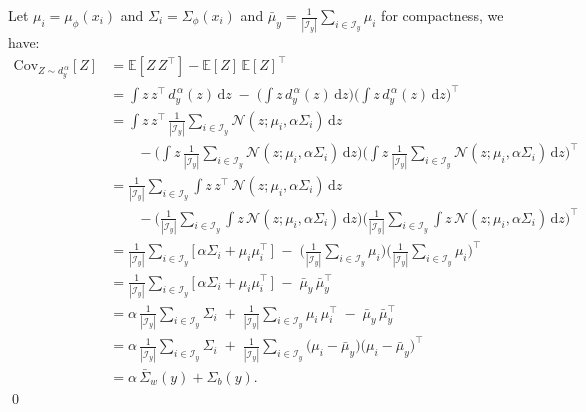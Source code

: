 Let
$\mu_i = \mu_\phi(x_i)$ and $\Sigma_i = \Sigma_\phi(x_i)$
and
$\bar\mu_y = \tfrac{1}{|\mathcal{I}_y|}\sum_{i \in \mathcal{I}_y} \mu_i$ for compactness, we have:
\begingroup
\allowdisplaybreaks
\begin{align*}
\mathrm{Cov}_{Z \sim d_y^{\,\alpha}}[Z]
&= \mathbb{E}[Z\,Z^{\!\top}] - \mathbb{E}[Z]\,\mathbb{E}[Z]^{\!\top} \\
&= \int z\,z^{\!\top}\,d_y^{\,\alpha}(z)\,\mathrm{d}z
 \;-\; \biggl(\int z\,d_y^{\,\alpha}(z)\,\mathrm{d}z\biggr)
       \biggl(\int z\,d_y^{\,\alpha}(z)\,\mathrm{d}z\biggr)^{\!\!\top} \\
&= \int z\,z^{\!\top}\,\frac{1}{|\mathcal{I}_y|}\sum_{i \in \mathcal{I}_y}\mathcal{N}\!(z;\mu_i,\alpha\Sigma_i)\,\mathrm{d}z \\
&\qquad - \biggl(\int z\,\frac{1}{|\mathcal{I}_y|}\sum_{i \in \mathcal{I}_y}\mathcal{N}\!(z;\mu_i,\alpha\Sigma_i)\,\mathrm{d}z\biggr)
         \biggl(\int z\,\frac{1}{|\mathcal{I}_y|}\sum_{i \in \mathcal{I}_y}\mathcal{N}\!(z;\mu_i,\alpha\Sigma_i)\,\mathrm{d}z\biggr)^{\!\!\top} \\
&= \frac{1}{|\mathcal{I}_y|}\sum_{i \in \mathcal{I}_y}
     \int z\,z^{\!\top}\,\mathcal{N}\!(z;\mu_i,\alpha\Sigma_i)\,\mathrm{d}z \\
&\qquad - \biggl(\frac{1}{|\mathcal{I}_y|}\sum_{i \in \mathcal{I}_y}
           \int z\,\mathcal{N}\!(z;\mu_i,\alpha\Sigma_i)\,\mathrm{d}z\biggr)
         \biggl(\frac{1}{|\mathcal{I}_y|}\sum_{i \in \mathcal{I}_y}
           \int z\,\mathcal{N}\!(z;\mu_i,\alpha\Sigma_i)\,\mathrm{d}z\biggr)^{\!\!\top} \\
&= \frac{1}{|\mathcal{I}_y|}\sum_{i \in \mathcal{I}_y}
     \bigl[\,\alpha\Sigma_i + \mu_i\mu_i^{\!\top}\,\bigr]
   \;-\; \biggl(\frac{1}{|\mathcal{I}_y|}\sum_{i \in \mathcal{I}_y} \mu_i\biggr)
         \biggl(\frac{1}{|\mathcal{I}_y|}\sum_{i \in \mathcal{I}_y} \mu_i\biggr)^{\!\!\top} \\
&= \frac{1}{|\mathcal{I}_y|}\sum_{i \in \mathcal{I}_y}
     \bigl[\,\alpha\Sigma_i + \mu_i\mu_i^{\!\top}\,\bigr]
   \;-\; \bar\mu_y\,\bar\mu_y^{\!\top} \\
&= \alpha\,\frac{1}{|\mathcal{I}_y|}\sum_{i \in \mathcal{I}_y} \Sigma_i
   \;+\; \frac{1}{|\mathcal{I}_y|}\sum_{i \in \mathcal{I}_y} \mu_i\,\mu_i^{\!\top}
   \;-\; \bar\mu_y\,\bar\mu_y^{\!\top} \\
&= \alpha\,\frac{1}{|\mathcal{I}_y|}\sum_{i \in \mathcal{I}_y} \Sigma_i
   \;+\; \frac{1}{|\mathcal{I}_y|}\sum_{i \in \mathcal{I}_y}
         \bigl(\mu_i - \bar\mu_y\bigr)\bigl(\mu_i - \bar\mu_y\bigr)^{\!\top} \\
&= \alpha\,\bar\Sigma_w(y) + \Sigma_b(y).
\end{align*}
\endgroup
\qed


